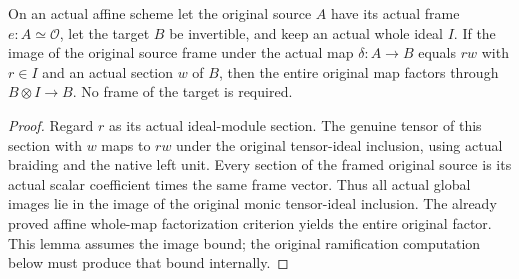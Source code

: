 \begin{lemma}
\label{lem:kn-nadel-bounded-affine-frame-factor}
\leanok
{}
On an actual affine scheme let the original source $A$ have its actual
frame $e:A\simeq\mathcal O$, let the target $B$ be invertible, and keep
an actual whole ideal $I$. If the image of the original source frame under
the actual map $\delta:A\to B$ equals $r w$ with $r\in I$ and an actual
section $w$ of $B$, then the entire original map factors through
$B\otimes I\to B$. No frame of the target is required.
\end{lemma}
\begin{proof}
Regard $r$ as its actual ideal-module section. The genuine tensor of this
section with $w$ maps to $r w$ under the original tensor-ideal inclusion,
using actual braiding and the native left unit. Every section of the
framed original source is its actual scalar coefficient times the same
frame vector. Thus all actual global images lie in the image of the
original monic tensor-ideal inclusion. The already proved affine whole-map
factorization criterion yields the entire original factor. This lemma
assumes the image bound; the original ramification computation below must
produce that bound internally.
\end{proof}

